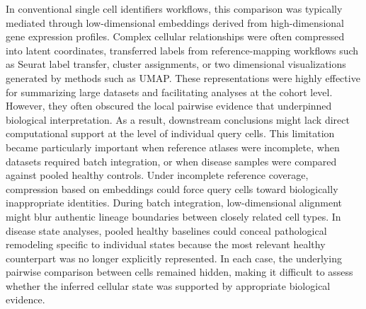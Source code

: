 \documentclass[11pt]{article}
\begin{document}
In conventional single cell identifiers workflows, this comparison was typically mediated through low-dimensional embeddings\cite{Becht2019DimensionalityReduction} derived from high-dimensional gene expression profiles\cite{Luecken2019BestPractices,Heumos2023BestPractices}. Complex cellular relationships were often compressed into latent coordinates, transferred labels from reference-mapping workflows such as Seurat label transfer\cite{Stuart2019Seurat}, cluster assignments, or two dimensional visualizations generated by methods such as UMAP\cite{McInnes2018UMAP,Becht2019DimensionalityReduction}. These representations were highly effective for summarizing large datasets and facilitating analyses at the cohort level\cite{Amezquita2020Orchestrating,Heumos2023BestPractices}. However, they often obscured the local pairwise evidence that underpinned biological interpretation\cite{Kiselev2019Challenges,Lahnemann2020Challenges}. As a result, downstream conclusions might lack direct computational support at the level of individual query cells\cite{Abdelaal2019ComparisonAnnotation,Pasquini2021AnnotationReview}. This limitation became particularly important when reference atlases were incomplete, when datasets required batch integration, or when disease samples were compared against pooled healthy controls\cite{Haghverdi2018BatchEffects,Luecken2022IntegrationBenchmark,Heumos2023BestPractices}. Under incomplete reference coverage, compression based on embeddings could force query cells toward biologically inappropriate identities\cite{Abdelaal2019ComparisonAnnotation,Pasquini2021AnnotationReview}. During batch integration, low-dimensional alignment might blur authentic lineage boundaries between closely related cell types\cite{Haghverdi2018BatchEffects,Luecken2022IntegrationBenchmark}. In disease state analyses, pooled healthy baselines could conceal pathological remodeling specific to individual states because the most relevant healthy counterpart was no longer explicitly represented\cite{Trapnell2015CellTypesStates,Lake2023KidneyAtlas}. In each case, the underlying pairwise comparison between cells remained hidden, making it difficult to assess whether the inferred cellular state was supported by appropriate biological evidence\cite{Kiselev2019Challenges,Lahnemann2020Challenges,Heumos2023BestPractices}.
\end{document}
